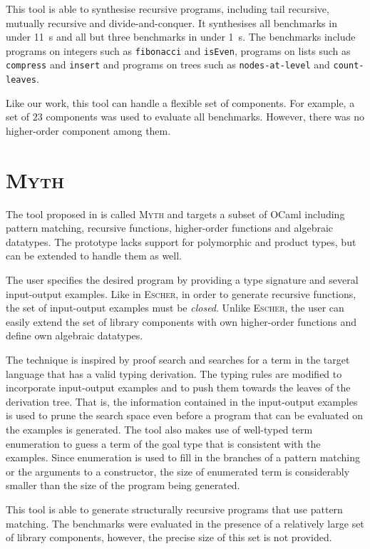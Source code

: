 This tool is able to synthesise recursive programs, including tail recursive, mutually recursive and divide-and-conquer. It synthesises all benchmarks in under \SI{11}{s} and all but three benchmarks in under \SI{1}{s}. The benchmarks include programs on integers such as \lstinline!fibonacci! and \lstinline!isEven!, programs on lists such as \lstinline!compress! and \lstinline!insert! and programs on trees such as \lstinline!nodes-at-level! and \lstinline!count-leaves!.

Like our work, this tool can handle a flexible set of components. For example, a set of $23$ components was used to evaluate all benchmarks. However, there was no higher-order component among them.

\section{\mdseries\textsc{Myth}}

The tool proposed in \cite{MythPaper} is called \textsc{Myth} and targets a subset of OCaml including pattern matching, recursive functions, higher-order functions and algebraic datatypes. The prototype lacks support for polymorphic and product types, but can be extended to handle them as well.

The user specifies the desired program by providing a type signature and several input-output examples. Like in \textsc{Escher}, in order to generate recursive functions, the set of input-output examples must be \emph{closed}. Unlike \textsc{Escher}, the user can easily extend the set of library components with own higher-order functions and define own algebraic datatypes.

The technique is inspired by proof search and searches for a term in the target language that has a valid typing derivation. The typing rules are modified to incorporate input-output examples and to push them towards the leaves of the derivation tree. That is, the information contained in the input-output examples is used to prune the search space even before a program that can be evaluated on the examples is generated. The tool also makes use of well-typed term enumeration to guess a term of the goal type that is consistent with the examples. Since enumeration is used to fill in the branches of a pattern matching or the arguments to a constructor, the size of enumerated term is considerably smaller than the size of the program being generated.

This tool is able to generate structurally recursive programs that use pattern matching. The benchmarks were evaluated in the presence of a relatively large set of library components, however, the precise size of this set is not provided. 



